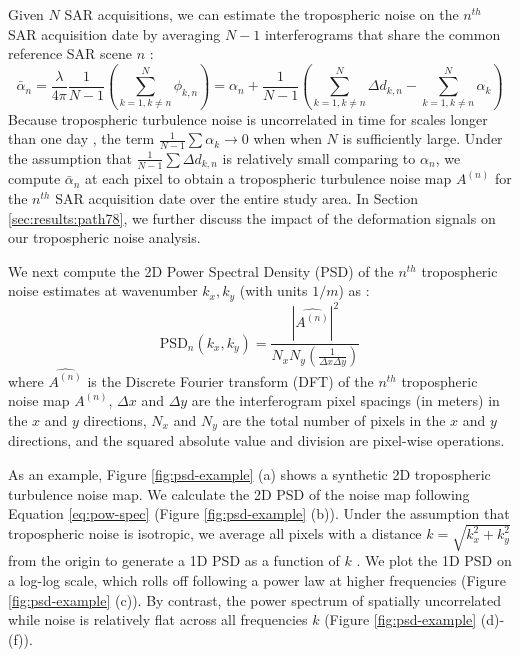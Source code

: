 \documentclass{utexasthesis}
\begin{document}
Given $N$ SAR acquisitions, we can estimate the tropospheric noise on the $n^{th}$ SAR acquisition date by averaging $N-1$ interferograms that share the common reference SAR scene $n$ \cite{Tymofyeyeva2015MitigationAtmosphericPhase}:
\begin{equation}
	\bar{\alpha}_n = \frac{\lambda}{4 \pi} \frac{1}{N-1} \left(\sum_{k=1, k \neq n}^{N} \phi_{k,n}\right)  =  \alpha_n  + \frac{1}{N-1} \left( \sum_{k=1, k \neq n}^{N}  \Delta d_{k,n} - \sum_{k=1, k \neq n}^{N}  \alpha_k  \right)  \label{eq:avg-ifg} 
\end{equation}
Because tropospheric turbulence noise is uncorrelated in time for scales longer than one day \cite{Emardson2003NeutralAtmosphericDelay, Onn2006ModelingWaterVapor}, the term $ \frac{1}{N-1} \sum \alpha_k \rightarrow 0$ when  when $N$ is sufficiently large. 
Under the assumption that $ \frac{1}{N-1} \sum \Delta d_{k,n} $ is relatively small comparing to $\alpha_n$, we compute $ \bar{\alpha}_n $ at each pixel to obtain a tropospheric turbulence noise map $A^{(n)}$ for the $n^{th}$ SAR acquisition date over the entire study area. In Section \ref{sec:results:path78}, we further discuss the impact of the deformation signals on our tropospheric noise analysis.


We next compute the 2D Power Spectral Density (PSD) of the $n^{th}$ tropospheric noise estimates at  wavenumber $ k_x, k_y $ (with units $1/m$) as \cite{Jacobs2017QuantitativeCharacterizationSurface}:
\begin{equation}
	\text{PSD}_n(k_x, k_y) = \frac{| \widehat{A^{(n)}} |^2 }{N_x N_y (\frac{1}{\Delta x \Delta y}) } \label{eq:pow-spec}
\end{equation}
where  $\widehat{A^{(n)}}$ is the Discrete Fourier transform (DFT) of  the $n^{th}$ tropospheric noise map $A^{(n)}$, $\Delta x$ and $\Delta y$ are the interferogram pixel spacings (in meters) in the $x$ and $y$ directions, $N_x$ and $N_y$ are the total number of pixels in the $x$ and $y$ directions, and the squared absolute value and division are pixel-wise operations. 


As an example, Figure \ref{fig:psd-example} (a) shows a synthetic 2D tropospheric turbulence noise map. We calculate the 2D PSD of the noise map following Equation \eqref{eq:pow-spec} (Figure \ref{fig:psd-example} (b)). Under the assumption that tropospheric noise is isotropic, we average all pixels with a distance  $k= \sqrt{k_x^2 + k_y^2}$ from the origin to generate a 1D PSD as a function of $k$ \cite{Hanssen2001RadarInterferometryData}.
We plot the 1D PSD on a log-log scale, which rolls off following a power law at higher frequencies (Figure \ref{fig:psd-example} (c)). By contrast, the power spectrum of spatially uncorrelated while noise is relatively flat across all frequencies $k$ (Figure \ref{fig:psd-example} (d)-(f)).
\end{document}
